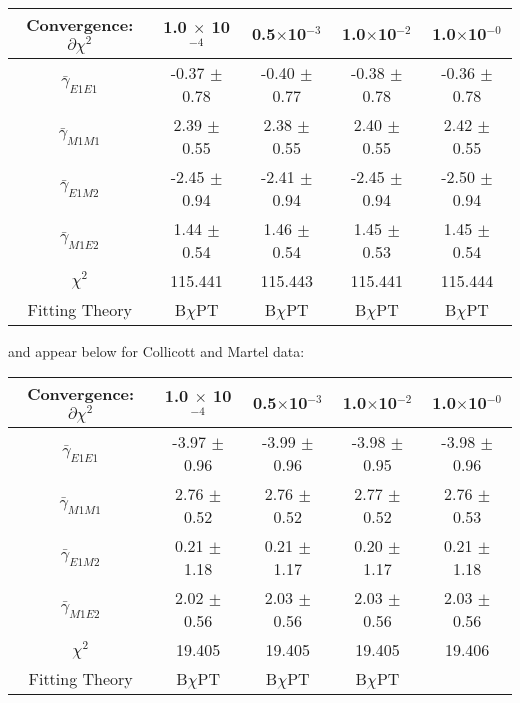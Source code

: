 \documentclass[]{article}
\begin{document}
\begin{table}[h!]
	\centering %
	\begin{tabular}{|c|c|c|c|c|} %
		\hline
		Convergence: $\partial\chi^{2}$ & 1.0 $\times$ 10$^{-4}$ & 0.5$\times$10$^{-3}$ & 1.0$\times$10$^{-2}$ & 1.0$\times$10$^{-0}$\\
		\hline %
		$\bar{\gamma}_{E1E1}$ & -0.37 $\pm$ 0.78 & -0.40 $\pm$ 0.77 & -0.38 $\pm$ 0.78 & -0.36 $\pm$ 0.78\\ 
		$\bar{\gamma}_{M1M1}$ & 2.39 $\pm$ 0.55 & 2.38 $\pm$ 0.55 & 2.40 $\pm$ 0.55 & 2.42 $\pm$ 0.55\\
		$\bar{\gamma}_{E1M2}$ & -2.45 $\pm$ 0.94 & -2.41 $\pm$ 0.94 & -2.45 $\pm$ 0.94 & -2.50 $\pm$ 0.94 \\
		$\bar{\gamma}_{M1E2}$ & 1.44 $\pm$ 0.54 & 1.46 $\pm$ 0.54 & 1.45 $\pm$ 0.53 & 1.45 $\pm$ 0.54\\[0.5ex]
		$\chi^{2}$ & 115.441 & 115.443 & 115.441 & 115.444\\
		\hline
		Fitting Theory & B$\chi$PT & B$\chi$PT & B$\chi$PT & B$\chi$PT \\
		\hline
	\end{tabular}
\end{table}

\noindent and appear below for Collicott and Martel data:

\begin{table}[h!]
	\centering %
	\begin{tabular}{|c|c|c|c|c|} %
		\hline
		Convergence: $\partial\chi^{2}$ & 1.0 $\times$ 10$^{-4}$ & 0.5$\times$10$^{-3}$ & 1.0$\times$10$^{-2}$ & 1.0$\times$10$^{-0}$\\
		\hline %
		$\bar{\gamma}_{E1E1}$ & -3.97 $\pm$ 0.96 & -3.99 $\pm$ 0.96 & -3.98 $\pm$ 0.95 & -3.98 $\pm$ 0.96\\ 
		$\bar{\gamma}_{M1M1}$ & 2.76 $\pm$ 0.52 & 2.76 $\pm$ 0.52 & 2.77 $\pm$ 0.52 & 2.76 $\pm$ 0.53  \\
		$\bar{\gamma}_{E1M2}$ & 0.21 $\pm$ 1.18 & 0.21 $\pm$ 1.17 & 0.20 $\pm$ 1.17 & 0.21 $\pm$ 1.18\\
		$\bar{\gamma}_{M1E2}$ & 2.02 $\pm$ 0.56 & 2.03 $\pm$ 0.56 & 2.03 $\pm$ 0.56 & 2.03 $\pm$ 0.56 \\[0.5ex]
		$\chi^{2}$ & 19.405 & 19.405 & 19.405 & 19.406\\
		\hline
		Fitting Theory & B$\chi$PT & B$\chi$PT & B$\chi$PT & \\
		\hline
	\end{tabular}
\end{table}
\end{document}
